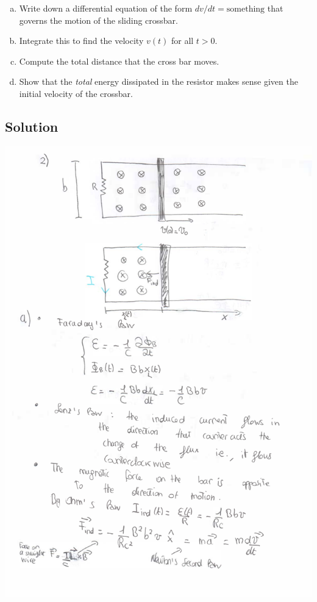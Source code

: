 \documentclass[solutions]{esg8022pset}
\begin{document}
  \begin{enumerate}[(a)]
    \item Write down a differential equation of the form $dv/dt = \text{something}$ that governs the motion of the sliding crossbar.
    \item Integrate this to find the velocity $v(t)$ for all $t > 0$.
    \item Compute the total distance that the cross bar moves.
    \item Show that the \emph{total} energy dissipated in the resistor makes sense given the initial velocity of the crossbar.
  \end{enumerate}
\subsection{Solution}
  \begin{center}
    \includegraphics[width = \textwidth, height = 0.9\textheight, keepaspectratio = true]{ps9_2a}

\end{center}
\end{document}
